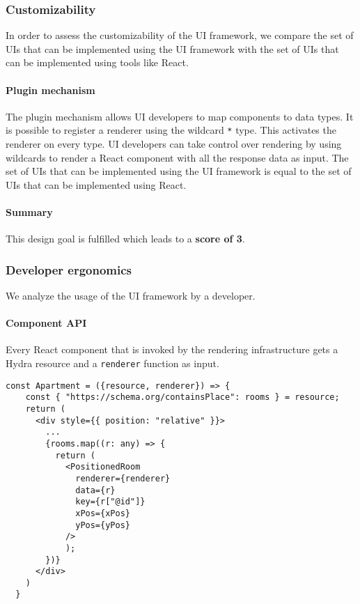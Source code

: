 \subsubsection{Customizability}
In order to assess the customizability of the UI framework, we compare the set of UIs that can be implemented using the UI framework with the set of UIs that can be implemented using tools like React.

\paragraph{Plugin mechanism}
The plugin mechanism allows UI developers to map components to data types. It is possible to register a renderer using the wildcard \lstinline{*} type. This activates the renderer on every type. UI developers can take control over rendering by using wildcards to render a React component with all the response data as input. The set of UIs that can be implemented using the UI framework is equal to the set of UIs that can be implemented using React.

\paragraph{Summary}
This design goal is fulfilled which leads to a \textbf{score of 3}.

\subsubsection{Developer ergonomics}
We analyze the usage of the UI framework by a developer.

\paragraph{Component API}
Every React component that is invoked by the rendering infrastructure gets a Hydra resource and a \lstinline{renderer} function as input.

\lstset{language=JSON}
\begin{lstlisting}[caption={React component API for the apartment renderer as shown in figure \ref{fig:apartmentrenderer}.}, label={lst:componentapi}]
  const Apartment = ({resource, renderer}) => {
    const { "https://schema.org/containsPlace": rooms } = resource;
    return (
      <div style={{ position: "relative" }}>
        ...
        {rooms.map((r: any) => {
          return (
            <PositionedRoom
              renderer={renderer}
              data={r}
              key={r["@id"]}
              xPos={xPos}
              yPos={yPos}
            />
            );
        })}
      </div>
    )
  }
\end{lstlisting}

